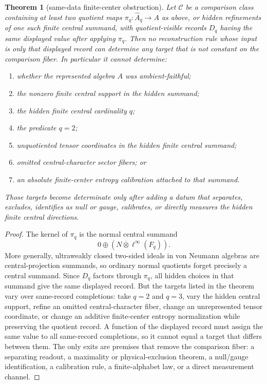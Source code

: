 \documentclass[12pt]{article}
\newtheorem{theorem}{Theorem}
\theoremstyle{definition}
\theoremstyle{remark}
\begin{document}
\begin{theorem}[same-data finite-center obstruction]
\label{thm:same-data}
Let \(\mathcal C\) be a comparison class containing at least two quotient maps
\(\pi_q:\widehat A_q\to A\) as above, or hidden refinements of one such finite
central summand, with quotient-visible records \(D_q\) having the same
displayed value after applying \(\pi_q\).  Then no reconstruction rule whose
input is only that displayed record can determine any target that is not
constant on the comparison fiber.  In particular it cannot determine:
\begin{enumerate}
  \item whether the represented algebra \(A\) was ambient-faithful;
  \item the nonzero finite central support in the hidden summand;
  \item the hidden finite central cardinality \(q\);
  \item the predicate \(q=2\);
  \item unquotiented tensor coordinates in the hidden finite central summand;
  \item omitted central-character sector fibers; or
  \item an absolute finite-center entropy calibration attached to that summand.
\end{enumerate}
Those targets become determinate only after adding a datum that separates,
excludes, identifies as null or gauge, calibrates, or directly measures the
hidden finite central directions.
\end{theorem}

\begin{proof}
The kernel of \(\pi_q\) is the normal central summand
\[
  0\oplus \left(N\overline\otimes \ell^\infty(F_q)\right).
\]
More generally, ultraweakly closed two-sided ideals in von Neumann algebras are
central-projection summands, so ordinary normal quotients forget precisely a
central summand.  Since \(D_q\) factors through \(\pi_q\), all hidden choices in
that summand give the same displayed record.  But the targets listed in the
theorem vary over same-record completions: take \(q=2\) and \(q=3\), vary the
hidden central support, refine an omitted central-character fiber, change an
unrepresented tensor coordinate, or change an additive finite-center entropy
normalization while preserving the quotient record.  A function of the
displayed record must assign the same value to all same-record completions, so
it cannot equal a target that differs between them.  The only exits are
premises that remove the comparison fiber: a separating readout, a maximality
or physical-exclusion theorem, a null/gauge identification, a calibration
rule, a finite-alphabet law, or a direct measurement channel.
\end{proof}
\end{document}
